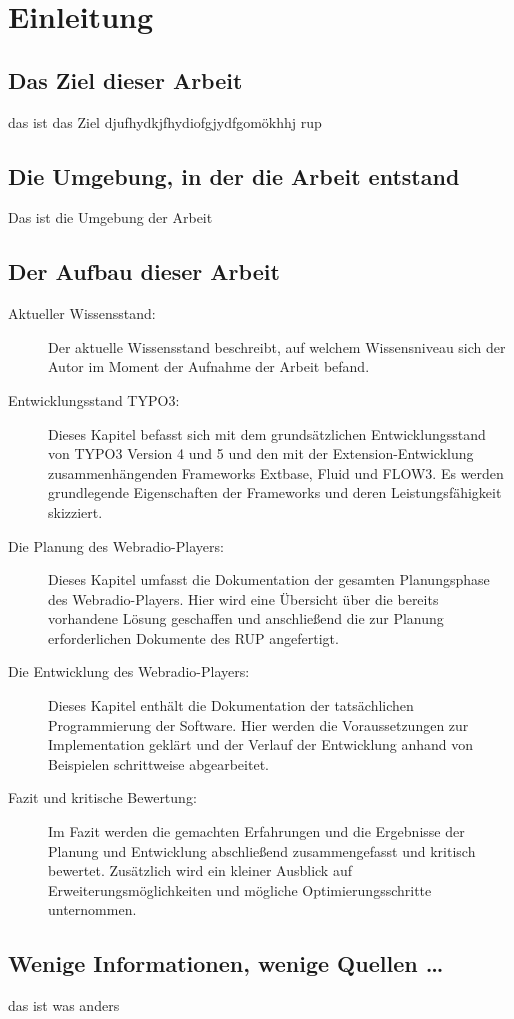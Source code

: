 
\chapter{Einleitung}
\label{cha:Einleitung}


\section{Das Ziel dieser Arbeit}
\label{sec:ZielDerArbeit}
das ist das Ziel 
djufhydkjfhydiofgjydfgomökhhj \gls{rup}

\section{Die Umgebung, in der die Arbeit entstand}
\label{sec:EntstehungsUmgebungArbeit}

Das ist die Umgebung der Arbeit

\section{Der Aufbau dieser Arbeit}
\label{sec:AufbauDieserArbeit}



\begin{description}

	\item[Aktueller Wissensstand:] Der aktuelle Wissensstand beschreibt, auf welchem Wissensniveau sich der Autor im Moment der Aufnahme der Arbeit befand.
	
	\item[Entwicklungsstand TYPO3:] Dieses Kapitel befasst sich mit dem grunds\"atzlichen Entwicklungsstand von TYPO3 Version 4 und 5 und den mit der Extension-Entwicklung zusammenh\"angenden Frameworks Extbase, Fluid und FLOW3. Es werden grundlegende Eigenschaften der Frameworks und deren Leistungsf\"ahigkeit skizziert.
	
	\item[Die Planung des Webradio-Players:] Dieses Kapitel umfasst die Dokumentation der gesamten Planungsphase des Webradio-Players. Hier wird eine Übersicht über die bereits vorhandene Lösung geschaffen und anschließend die zur Planung erforderlichen Dokumente des RUP angefertigt.
	
	\item[Die Entwicklung des Webradio-Players:] Dieses Kapitel enthält die Dokumentation der tatsächlichen Programmierung der Software. Hier werden die Voraussetzungen zur Implementation geklärt und der Verlauf der Entwicklung anhand von Beispielen schrittweise abgearbeitet.
	
	\item[Fazit und kritische Bewertung:] Im Fazit werden die gemachten Erfahrungen und die Ergebnisse der Planung und Entwicklung abschließend zusammengefasst und kritisch bewertet. Zusätzlich wird ein kleiner Ausblick auf Erweiterungsmöglichkeiten und mögliche Optimierungsschritte unternommen.

\end{description}


\section{Wenige Informationen, wenige Quellen \dots}
\label{sec:Quellenlage}
das ist was anders
